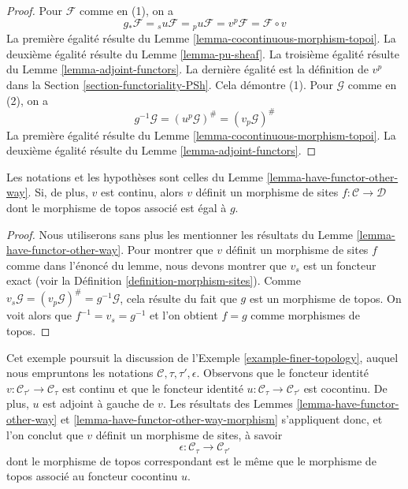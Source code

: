 \begin{proof}
Pour $\mathcal{F}$ comme en (1), on a
$$
g_*\mathcal{F} =
{}_su\mathcal{F} =
{}_pu\mathcal{F} =
v^p\mathcal{F} =
\mathcal{F} \circ v
$$
La première égalité résulte du Lemme \ref{lemma-cocontinuous-morphism-topoi}.
La deuxième égalité résulte du Lemme \ref{lemma-pu-sheaf}.
La troisième égalité résulte du Lemme \ref{lemma-adjoint-functors}.
La dernière égalité est la définition de $v^p$ dans la
Section \ref{section-functoriality-PSh}. Cela démontre (1).
Pour $\mathcal{G}$ comme en (2), on a
$$
g^{-1}\mathcal{G} = (u^p\mathcal{G})^\# = (v_p\mathcal{G})^\#
$$
La première égalité résulte du Lemme \ref{lemma-cocontinuous-morphism-topoi}.
La deuxième égalité résulte du Lemme \ref{lemma-adjoint-functors}.
\end{proof}

\begin{lemma}
\label{lemma-have-functor-other-way-morphism}
Les notations et les hypothèses sont celles du
Lemme \ref{lemma-have-functor-other-way}.
Si, de plus, $v$ est continu, alors $v$ définit un morphisme de sites
$f : \mathcal{C} \to \mathcal{D}$ dont le morphisme de topos associé est égal
à $g$.
\end{lemma}

\begin{proof}
Nous utiliserons sans plus les mentionner les résultats du
Lemme \ref{lemma-have-functor-other-way}. Pour montrer que $v$ définit un
morphisme de sites $f$ comme dans l’énoncé du lemme, nous devons montrer que
$v_s$ est un foncteur exact (voir la
Définition \ref{definition-morphism-sites}). Comme
$v_s\mathcal{G} = (v_p\mathcal{G})^\# = g^{-1}\mathcal{G}$, cela résulte du
fait que $g$ est un morphisme de topos. On voit alors que
$f^{-1} = v_s = g^{-1}$ et l’on obtient $f = g$ comme morphismes de topos.
\end{proof}

\begin{example}
\label{example-finer-topology-bis}
Cet exemple poursuit la discussion de l’Exemple \ref{example-finer-topology},
auquel nous empruntons les notations $\mathcal{C}, \tau, \tau', \epsilon$.
Observons que le foncteur identité
$v : \mathcal{C}_{\tau'} \to \mathcal{C}_\tau$ est continu et que le foncteur
identité $u : \mathcal{C}_\tau \to \mathcal{C}_{\tau'}$ est cocontinu. De
plus, $u$ est adjoint à gauche de $v$. Les résultats des
Lemmes \ref{lemma-have-functor-other-way} et
\ref{lemma-have-functor-other-way-morphism} s’appliquent donc, et l’on conclut
que $v$ définit un morphisme de sites, à savoir
$$
\epsilon : \mathcal{C}_\tau \longrightarrow \mathcal{C}_{\tau'}
$$
dont le morphisme de topos correspondant est le même que le morphisme de topos
associé au foncteur cocontinu $u$.
\end{example}

